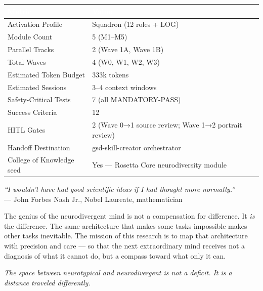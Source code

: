 \documentclass[11pt,letterpaper]{article}
\newcommand{\tableheader}[1]{\textbf{\sffamily\textcolor{white}{#1}}}
\begin{document}
\begin{center}
\begin{tabularx}{\textwidth}{L{5cm}X}
\toprule
{}
\tableheader{Metric} & \tableheader{Value} \\
\midrule
Activation Profile & Squadron (12 roles + LOG) \\
Module Count & 5 (M1--M5) \\
Parallel Tracks & 2 (Wave 1A, Wave 1B) \\
Total Waves & 4 (W0, W1, W2, W3) \\
Estimated Token Budget & 333k tokens \\
Estimated Sessions & 3--4 context windows \\
Safety-Critical Tests & 7 (all MANDATORY-PASS) \\
Success Criteria & 12 \\
HITL Gates & 2 (Wave 0→1 source review; Wave 1→2 portrait review) \\
Handoff Destination & gsd-skill-creator orchestrator \\
College of Knowledge seed & Yes --- Rosetta Core neurodiversity module \\
\bottomrule
\end{tabularx}
\end{center}

\vspace{2em}

\begin{quotebox}
\textit{``I wouldn't have had good scientific ideas if I had thought more normally.''}\\[0.5em]
\hfill --- John Forbes Nash Jr., Nobel Laureate, mathematician

\vspace{0.8em}
The genius of the neurodivergent mind is not a compensation for difference. It \textit{is} the difference. The same architecture that makes some tasks impossible makes other tasks inevitable. The mission of this research is to map that architecture with precision and care --- so that the next extraordinary mind receives not a diagnosis of what it cannot do, but a compass toward what only it can.

\vspace{0.8em}
\textit{The space between neurotypical and neurodivergent is not a deficit. It is a distance traveled differently.}
\end{quotebox}
\end{document}
